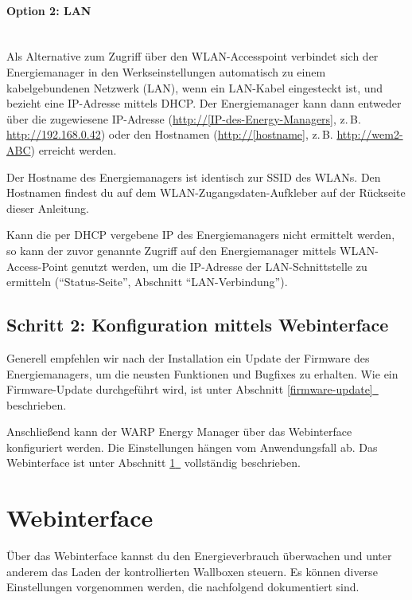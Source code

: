 \documentclass[a4paper,10pt]{article}
\newcommand*{\fullref}[1]{Abschnitt \hyperref[{#1}]{\ref*{#1}~\nameref*{#1}}}
\begin{document}
\begin{multicols*}{2}
	\columnbreak

	\paragraph{Option 2: LAN}\ \\
	Als Alternative zum Zugriff über den WLAN-Accesspoint verbindet sich der
	Energiemanager in den Werkseinstellungen automatisch zu einem
	kabelgebundenen Netzwerk (LAN), wenn ein LAN-Kabel eingesteckt ist, und bezieht eine IP-Adresse
	mittels DHCP. Der Energiemanager kann dann entweder über die zugewiesene IP-Adresse
	(\url{http://[IP-des-Energy-Managers]}, z.\,B. \url{http://192.168.0.42})
	oder den Hostnamen (\url{http://[hostname]}, z.\,B. \url{http://wem2-ABC}) erreicht werden.

	Der Hostname des Energiemanagers ist identisch zur SSID des WLANs. Den Hostnamen findest du
	auf dem WLAN-Zugangsdaten-Aufkleber auf der Rückseite dieser Anleitung.

	Kann die per DHCP vergebene IP des Energiemanagers nicht ermittelt werden, so kann der
	zuvor genannte Zugriff auf den Energiemanager mittels WLAN-Access-Point genutzt
	werden, um die IP-Adresse der LAN-Schnittstelle zu ermitteln
	(\enquote{Status-Seite}, Abschnitt \enquote{LAN-Verbindung}).


	\subsection{Schritt 2: Konfiguration mittels Webinterface}
	Generell empfehlen wir nach der Installation ein Update der Firmware des
	Energiemanagers, um die neusten Funktionen und Bugfixes zu erhalten. Wie ein
	Firmware-Update durchgeführt wird, ist unter \fullref{firmware-update}
	beschrieben.

	Anschließend kann der WARP Energy Manager über das Webinterface konfiguriert
	werden. Die Einstellungen hängen vom Anwendungsfall ab.
	Das Webinterface ist unter \fullref{webinterface} vollständig beschrieben.

	\newpage
	\section{Webinterface}
	\label{webinterface}

	Über das Webinterface kannst du den Energieverbrauch überwachen und
	unter anderem das Laden der kontrollierten Wallboxen steuern.
	Es können diverse Einstellungen vorgenommen werden, die nachfolgend
	dokumentiert sind.


\end{multicols*}
\end{document}
